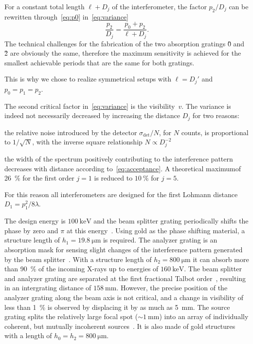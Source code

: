 For a constant total length $\ell + D_j$ of the interferometer, the factor
$p_2/D_j$ can be rewritten through~\eqref{eq:p0} in~\eqref{eq:variance}
\begin{equation*}
    \frac{p_2}{D_j} = \frac{p_0 + p_2}{\ell + D_j}.
\end{equation*}
The technical challenges for the fabrication of the two absorption gratings
\G0 and \G2 are obviously the same, therefore the maximum sensitivity is
achieved for the smallest achievable periods that are the same for both
gratings.

This is why we chose to realize symmetrical setups with $\ell = D_j'$ and $p_0 = p_1 = p_2$.

The second critical factor in~\eqref{eq:variance} is the visibility~$v$. The
variance is indeed not necessarily decreased by increasing the distance
$D_j$ for two reasons:
\begin{aenumerate}
    \item the relative noise introduced by the detector
        $\sigma_{\text{det}}/N$, for
        $N$ counts, is proportional to $1 / \sqrt{N}$, with the inverse
        square relationship $N \propto
        D_j^{-2}$
    \item the width of the spectrum positively contributing to the
        interference pattern decreases with distance according
        to~\eqref{eq:acceptance}. A theoretical maximum\cn of
        \SI{26}{\percent} for the first order $j = 1$ is reduced to
        $\SI{10}{\percent}$ for $j = 5$.
\end{aenumerate}
For this reason all interferometers are designed for the first Lohmann
distance $D_1 = p_1^2 / 8 \lambda$.

The design energy is $\SI{100}{\kilo\electronvolt}$ and the beam splitter
grating periodically shifts the phase by zero and $\pi$ at this
energy~\cite{David2002}. Using
gold as the phase shifting material, a structure length of
$h_1 = \SI{19.8}{\micro \metre}$ is required. The analyzer grating is an absorption mask
for sensing slight changes of the interference pattern generated by the beam
splitter~\cite{Momose2003a}. With a structure length of $h_2 =
\SI{800}{\micro \metre}$
it can absorb more than \SI{90}{\percent} of the incoming X-rays up to energies of 
$\SI{160}{\kilo\electronvolt}$. The beam splitter and analyzer grating are
separated at the first fractional Talbot order~\cite{Weitkamp2005},
resulting in an intergrating distance of $\SI{158}{\milli\metre}$. However,
the precise position of the analyzer grating along the beam axis is not
critical, and a change in visibility of less than \SI{1}{\percent} is
observed by displacing it by as much as \SI{5}{\milli\metre}. The
source grating splits the relatively large focal spot ($\sim
\SI{1}{\milli\metre}$) into an array of individually coherent, but mutually
incoherent sources~\cite{Pfeiffer2006}. It is also made of gold structures
with a length of $h_0 = h_2 = \SI{800}{\micro \metre}$.

